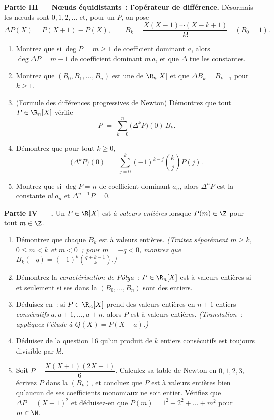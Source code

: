 \begin{problem}
\medskip
\noindent\textbf{Partie III --- Nœuds équidistants~: l'opérateur
de différence.} Désormais les nœuds sont $0, 1, 2, \dots$ et, pour
un  $P$, on pose
\[
\Delta P(X) = P(X + 1) - P(X),
\qquad
B_k = \frac{X(X-1)\cdots(X-k+1)}{k!} \quad (B_0 = 1).
\]
\begin{enumerate}[resume]
  \item Montrez que si $\deg P = m \geq 1$ de coefficient dominant
        $a$, alors $\deg \Delta P = m - 1$ de coefficient dominant
        $m\,a$, et que $\Delta$ tue les constantes.
  \item Montrez que $(B_0, B_1, \dots, B_n)$ est une  de
        $\R_n[X]$ et que $\Delta B_k = B_{k-1}$ pour $k \geq 1$.
  \item (Formule des différences progressives de Newton) Démontrez que
        tout $P \in \R_n[X]$ vérifie
        \[
        P \;=\; \sum_{k=0}^{n} \bigl(\Delta^{k} P\bigr)(0)\, B_k .
        \]
  \item Démontrez que pour tout $k \geq 0$,
        \[
        \bigl(\Delta^{k} P\bigr)(0) \;=\;
        \sum_{j=0}^{k} (-1)^{k-j} \binom{k}{j} P(j) .
        \]
  \item Montrez que si $\deg P = n$ de coefficient dominant $a_n$,
        alors $\Delta^{n} P$ est la constante $n!\,a_n$ et
        $\Delta^{n+1} P = 0$.
\end{enumerate}

\medskip
\noindent\textbf{Partie IV --- .} Un
 $P \in \R[X]$ est \emph{à valeurs entières} lorsque $P(m) \in
\Z$ pour tout $m \in \Z$.
\begin{enumerate}[resume]
  \item Démontrez que chaque $B_k$ est à valeurs entières.
        \emph{(Traitez séparément $m \geq k$, $0 \leq m < k$ et $m <
        0$~; pour $m = -q < 0$, montrez que $B_k(-q) = (-1)^k
        \binom{q + k - 1}{k}$.)}
  \item Démontrez la \emph{caractérisation de Pólya}~: $P \in \R_n[X]$
        est à valeurs entières si et seulement si ses  dans
        la  $(B_0, \dots, B_n)$ sont des entiers.
  \item Déduisez-en~: si $P \in \R_n[X]$ prend des valeurs entières en
        $n + 1$ entiers \emph{consécutifs} $a, a+1, \dots, a+n$, alors
        $P$ est à valeurs entières. \emph{(Translation~: appliquez
        l'étude à $Q(X) = P(X + a)$.)}
  \item Déduisez de la question 16 qu'un produit de $k$ entiers
        consécutifs est toujours divisible par $k!$.
  \item Soit $P = \dfrac{X(X+1)(2X+1)}{6}$. Calculez sa table de
        Newton en $0, 1, 2, 3$, écrivez $P$ dans la  $(B_k)$, et
        concluez que $P$ est à valeurs entières bien qu'aucun de ses
        coefficients monomiaux ne soit entier. Vérifiez que $\Delta P =
        (X+1)^2$ et déduisez-en que $P(m) = 1^2 + 2^2 + \dots + m^2$
        pour $m \in \N$.
\end{enumerate}


\end{problem}
